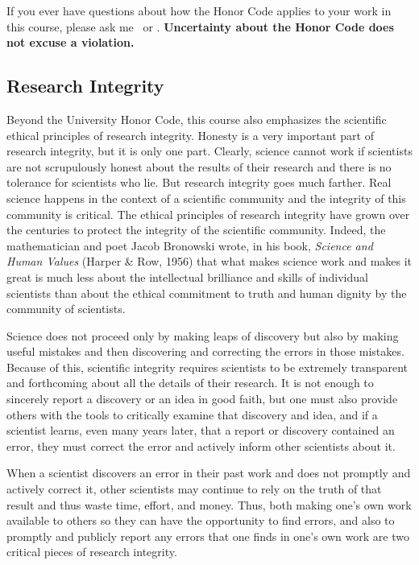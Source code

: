 \documentclass[11pt,twoside]{jgsyllabus}\usepackage[]{graphicx}\usepackage[]{color}
\begin{document}
If you ever
have questions about how the Honor Code applies to your work
in this course, please ask me%
\ifTA
\ or \TaTitle
\fi
.
\textbf{Uncertainty about the Honor Code does not excuse a violation.}

\subsection{Research Integrity}

Beyond the University Honor Code, this course also emphasizes the scientific
ethical principles of research integrity.
Honesty is a very important part of research integrity, but it is only one part.
Clearly, science cannot work if scientists are not scrupulously honest about
the results of their research and there is no tolerance for scientists who
lie. But research integrity goes much farther. Real science happens in the
context of a scientific community and the integrity of this community is
critical. The ethical principles of research
integrity have grown over the centuries to protect the integrity of the
scientific community. Indeed, the mathematician and poet Jacob Bronowski wrote,
in his book, \emph{Science and Human Values\/} (Harper \& Row, 1956) that what makes
science work and makes it great is much less about the intellectual brilliance
and skills of individual scientists than about the ethical commitment to truth
and human dignity by the community of scientists.

Science does not proceed only by making leaps of discovery
but also by making useful mistakes and then discovering and correcting the
errors in those mistakes. Because of this, scientific integrity requires
scientists to be extremely transparent and forthcoming about all the details of
their research. It is not enough to sincerely report a discovery or an idea in
good faith, but one must also provide others with the tools to critically
examine that discovery and idea, and if a scientist learns, even many years
later, that a report or discovery contained an error, they must
correct the error and actively inform other scientists about it.

When a scientist discovers an error in their past work and does not promptly
and actively correct it, other scientists may continue to rely on the truth of
that result and thus waste time, effort, and money.
Thus, both making one's own work available to others so they can have the
opportunity to find errors, and also to promptly and publicly report any
errors that one finds in one's own work are two critical pieces of research
integrity.
\end{document}
